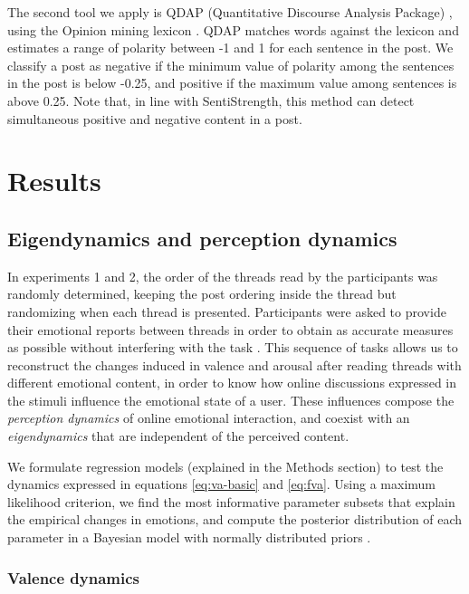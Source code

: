 \documentclass[nologo,url,11pt,a4paper]{ETHpaper}
\begin{document}
The second tool we apply is QDAP (Quantitative Discourse Analysis Package)
\cite{Rinker2013}, using the Opinion mining lexicon \cite{Hu2004}. QDAP
matches words against the lexicon and estimates a range of polarity between -1
and 1 for each sentence in the post.  We classify a post as negative if the
minimum value of polarity among the sentences in the post is below -0.25, and
positive if the maximum value among sentences is above 0.25. Note that, in
line with SentiStrength, this method can detect simultaneous positive and
negative content in a post.



\section{Results}

\subsection{Eigendynamics and perception dynamics}
\label{sec:perception}

In experiments 1 and  2, the order of the threads read by the participants was randomly determined, keeping the post ordering inside the thread but randomizing when each thread is presented.  
Participants were asked to provide their emotional reports between threads in order to obtain as accurate measures as possible without interfering with the task \cite{Robinson2002}.
This sequence of tasks allows us to reconstruct the changes induced in valence and arousal after reading threads with different emotional content, in order to know how online discussions expressed in the stimuli influence the emotional state of a user. 
These influences compose the \emph{perception dynamics} of online emotional interaction, and coexist with an \emph{eigendynamics} that are independent of the perceived content.

We formulate regression models (explained in the Methods section) to test the dynamics expressed in equations \ref{eq:va-basic} and \ref{eq:fva}. Using a maximum likelihood criterion, we find the most informative parameter subsets that explain the empirical changes in emotions, and compute the posterior distribution of each parameter in a Bayesian model with normally distributed priors \cite{Gelman2008}.

\subsubsection{Valence dynamics}
\end{document}
